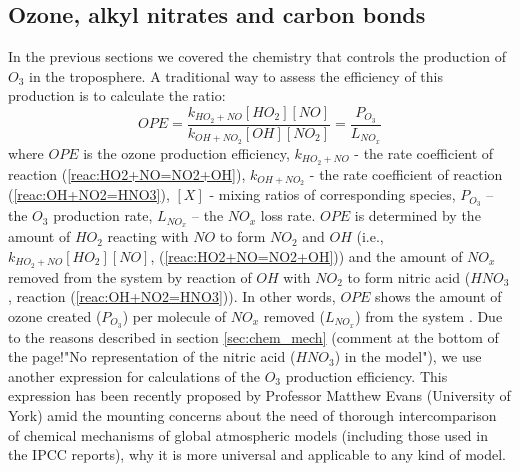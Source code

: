 \documentclass[11pt,a4paper]{article}
\begin{document}
\subsection{Ozone, alkyl nitrates and carbon bonds}
In the previous sections we covered the chemistry that controls the production of $O_3$ in the troposphere. A traditional way to assess the efficiency of this production is to calculate the ratio:
\begin{equation}\label{eq:OPE}
OPE = \dfrac{k_{HO_2+NO}[HO_2][NO]}{k_{OH+NO_2}[OH][NO_2]} = \dfrac{P_{O_3}}{L_{NO_x}}
\end{equation}
where $OPE$ is the ozone production efficiency, $k_{HO_2+NO}$ - the rate coefficient of reaction (\ref{reac:HO2+NO=NO2+OH}), $k_{OH+NO_2}$ - the rate coefficient of reaction (\ref{reac:OH+NO2=HNO3}), $[X]$ - mixing ratios of corresponding species, $P_{O_3}$ – the $O_3$ production rate, $L_{NO_x}$ – the $NO_x$ loss rate. $OPE$ is determined by the amount of $HO_2$ reacting with $NO$ to form $NO_2$ and $OH$ (i.e., $k_{HO_2+NO}[HO_2][NO]$, (\ref{reac:HO2+NO=NO2+OH})) and the amount of $NO_x$ removed from the system by reaction of $OH$ with $NO_2$ to form nitric acid ($HNO_3$, reaction (\ref{reac:OH+NO2=HNO3})). In other words, $OPE$ shows the amount of ozone created ($P_{O_3}$) per molecule of $NO_x$ removed ($L_{NO_x}$) from the system \citep{Jacob1999}. Due to the reasons described in section \ref{sec:chem_mech} (comment at the bottom of the page!"No representation of the nitric acid ($HNO_3$) in the model"), we use another expression for calculations of the $O_3$ production efficiency. This expression has been recently proposed by Professor Matthew Evans (University of York) amid the mounting concerns about the need of thorough intercomparison of chemical mechanisms of global atmospheric models (including those used in the IPCC reports), why it is more universal and applicable to any kind of model.
\end{document}
